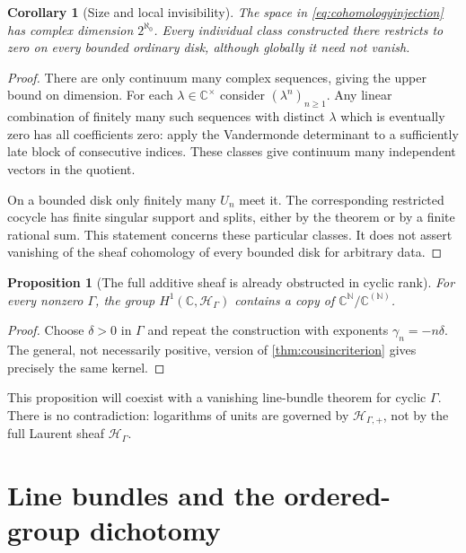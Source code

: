 \documentclass[11pt,letterpaper]{article}
\newtheorem{proposition}[theorem]{Proposition}
\newtheorem{corollary}[theorem]{Corollary}
\theoremstyle{definition}
\theoremstyle{remark}
\newcommand{\C}{\mathbb C}
\newcommand{\N}{\mathbb N}
\newcommand{\HH}{\mathscr H_\Gamma}
\newcommand{\HP}{\mathscr H_{\Gamma,+}}
\numberwithin{equation}{section}
\begin{document}
\begin{corollary}[Size and local invisibility]\label{cor:H1size}
The space in \eqref{eq:cohomologyinjection} has complex dimension $2^{\aleph_0}$. Every individual class constructed there restricts to zero on every bounded ordinary disk, although globally it need not vanish.
\end{corollary}
\begin{proof}
There are only continuum many complex sequences, giving the upper bound on dimension. For each $\lambda\in\C^\times$ consider $(\lambda^n)_{n\ge1}$. Any linear combination of finitely many such sequences with distinct $\lambda$ which is eventually zero has all coefficients zero: apply the Vandermonde determinant to a sufficiently late block of consecutive indices. These classes give continuum many independent vectors in the quotient.

On a bounded disk only finitely many $U_n$ meet it. The corresponding restricted cocycle has finite singular support and splits, either by the theorem or by a finite rational sum. This statement concerns these particular classes. It does not assert vanishing of the sheaf cohomology of every bounded disk for arbitrary data.
\end{proof}

\begin{proposition}[The full additive sheaf is already obstructed in cyclic rank]\label{prop:fulladditive}
For every nonzero $\Gamma$, the group $H^1(\C,\HH)$ contains a copy of $\C^{\N}/\C^{(\N)}$.
\end{proposition}
\begin{proof}
Choose $\delta>0$ in $\Gamma$ and repeat the construction with exponents $\gamma_n=-n\delta$. The general, not necessarily positive, version of \cref{thm:cousincriterion} gives precisely the same kernel.
\end{proof}
This proposition will coexist with a vanishing line-bundle theorem for cyclic $\Gamma$. There is no contradiction: logarithms of units are governed by $\HP$, not by the full Laurent sheaf $\HH$.

\section{Line bundles and the ordered-group dichotomy}\label{sec:linebundles}
\end{document}
